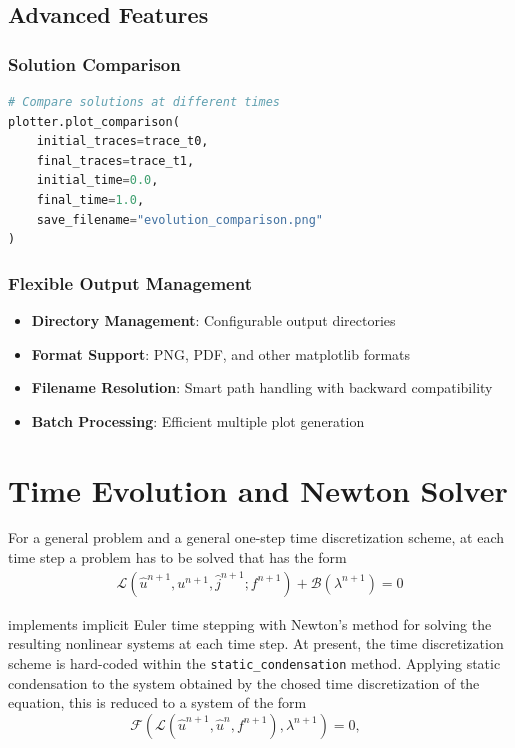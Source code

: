 \subsection{Advanced Features}

\subsubsection{Solution Comparison}
\begin{lstlisting}[language=Python, caption=Solution Comparison]
# Compare solutions at different times
plotter.plot_comparison(
    initial_traces=trace_t0,
    final_traces=trace_t1,
    initial_time=0.0,
    final_time=1.0,
    save_filename="evolution_comparison.png"
)
\end{lstlisting}

\subsubsection{Flexible Output Management}
\begin{itemize}
    \item \textbf{Directory Management}: Configurable output directories
    \item \textbf{Format Support}: PNG, PDF, and other matplotlib formats
    \item \textbf{Filename Resolution}: Smart path handling with backward compatibility
    \item \textbf{Batch Processing}: Efficient multiple plot generation
\end{itemize}

\section{Time Evolution and Newton Solver}
\label{sec:time_evolution}


\newcommand{\traceToBulk}{\mathcal{B}} 
\newcommand{\traceToFlux}{\mathcal{L}}	
\newcommand{\fluxBalance}{\mathcal{F}}

For a general problem and a general one-step time discretization scheme, at each time step a problem has to be solved that has the form
\begin{gather*}
\mathcal{L}(\widehat u^{n+1},u^{n+1},\widehat j^{n+1} ; f^{n+1}
) + \mathcal B(\lambda^{n+1})  = 0
\end{gather*}


\bionetflux{} implements implicit Euler time stepping with Newton's method for solving the resulting nonlinear systems at each time step. At present, the time discretization scheme is hard-coded within the {\tt static\_condensation} method. Applying static condensation to the system obtained by the chosed time discretization of the equation, this is reduced to a system of the form
\[
\fluxBalance(\traceToFlux(\widehat u^{n+1},\widehat u^n,f^{n+1}),\lambda^{n+1}) = 0, \qquad 
\] 

